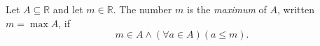 \begin{definition}[Maximum]
\label{def:maximum}
Let $A\subseteq\mathbb{R}$ and let $m\in\mathbb{R}$. The number $m$ is the
\emph{maximum} of $A$, written $m=\max A$, if
\[
  m\in A
  \land
  (\forall a\in A)(a\leq m).
\]
\end{definition}